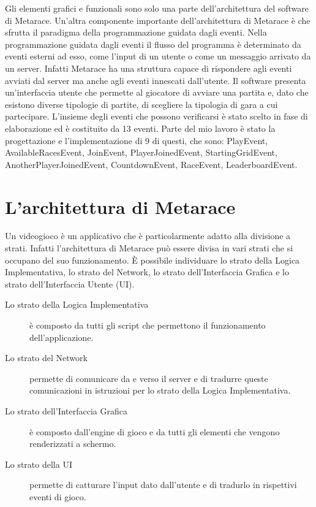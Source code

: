 
Gli elementi grafici e funzionali sono solo una parte dell'architettura del software di Metarace.
%
Un'altra componente importante dell'architettura di Metarace è che sfrutta il paradigma della programmazione guidata dagli eventi.
%
Nella programmazione guidata dagli eventi il flusso del programma è determinato da eventi esterni ad esso, come l'input di un utente o come un messaggio arrivato da un server.
%
Infatti Metarace ha una struttura capace di rispondere agli eventi avviati dal server ma anche agli eventi innescati dall'utente.
%
Il software presenta un'interfaccia utente che permette al giocatore di avviare una partita e, dato che esistono diverse tipologie di partite, di scegliere la tipologia di gara a cui partecipare.
%
L'insieme degli eventi che possono verificarsi è stato scelto in fase di elaborazione ed è costituito da 13 eventi.
%
Parte del mio lavoro è stato la progettazione e l'implementazione di 9 di questi, che sono: PlayEvent, AvailableRacesEvent, JoinEvent, PlayerJoinedEvent, StartingGridEvent, AnotherPlayerJoinedEvent, CountdownEvent, RaceEvent, LeaderboardEvent.

\section{L'architettura di Metarace}

Un videogioco è un applicativo che è particolarmente adatto alla divisione a strati.
%
Infatti l'architettura di Metarace può essere divisa in vari strati che si occupano del suo funzionamento.
%
È possibile individuare lo strato della Logica Implementativa, lo strato del Network, lo strato dell'Interfaccia Grafica e lo strato dell'Interfaccia Utente (UI).

\begin{description}
    \item[Lo strato della Logica Implementativa] è composto da tutti gli script che permettono il funzionamento dell'applicazione.
    \item[Lo strato del Network] permette di comunicare da e verso il server e di tradurre queste comunicazioni in istruzioni per lo strato della Logica Implementativa.
    \item[Lo strato dell'Interfaccia Grafica] è composto dall'engine di gioco e da tutti gli elementi che vengono renderizzati a schermo.
    \item[Lo strato della UI] permette di catturare l'input dato dall'utente e di tradurlo in rispettivi eventi di gioco.
\end{description}

